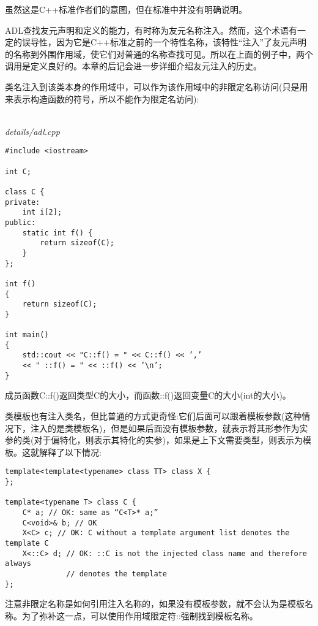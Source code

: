 \begin{tcolorbox}[colback=webgreen!5!white,colframe=webgreen!75!black]
\hspace*{0.75cm}虽然这是C++标准作者们的意图，但在标准中并没有明确说明。
\end{tcolorbox}

ADL查找友元声明和定义的能力，有时称为友元名称注入。然而，这个术语有一定的误导性，因为它是C++标准之前的一个特性名称，该特性“注入”了友元声明的名称到外围作用域，使它们对普通的名称查找可见。所以在上面的例子中，两个调用是定义良好的。本章的后记会进一步详细介绍友元注入的历史。


类名注入到该类本身的作用域中，可以作为该作用域中的非限定名称访问(只是用来表示构造函数的符号，所以不能作为限定名访问):

\hspace*{\fill} \\ %
\noindent
\textit{details/adl.cpp}
\begin{lstlisting}[style=styleCXX]
#include <iostream>

int C;

class C {
private:
	int i[2];
public:
	static int f() {
		return sizeof(C);
	}
};

int f()
{
	return sizeof(C);
}

int main()
{
	std::cout << "C::f() = " << C::f() << ’,’
	<< " ::f() = " << ::f() << ’\n’;
}
\end{lstlisting}

成员函数C::f()返回类型C的大小，而函数::f()返回变量C的大小(int的大小)。

类模板也有注入类名，但比普通的方式更奇怪:它们后面可以跟着模板参数(这种情况下，注入的是类模板名)，但是如果后面没有模板参数，就表示将其形参作为实参的类(对于偏特化，则表示其特化的实参)，如果是上下文需要类型，则表示为模板。这就解释了以下情况:

\begin{lstlisting}[style=styleCXX]
template<template<typename> class TT> class X {
};

template<typename T> class C {
	C* a; // OK: same as “C<T>* a;”
	C<void>& b; // OK
	X<C> c; // OK: C without a template argument list denotes the template C
	X<::C> d; // OK: ::C is not the injected class name and therefore always
			  // denotes the template
};
\end{lstlisting}

注意非限定名称是如何引用注入名称的，如果没有模板参数，就不会认为是模板名称。为了弥补这一点，可以使用作用域限定符::强制找到模板名称。

